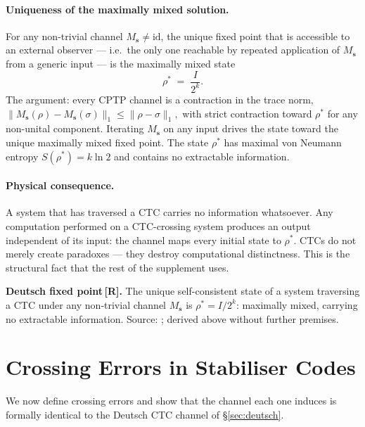 \documentclass[11pt,a4paper]{article}
\newcommand{\Rmark}{\textcolor{green!50!black}{\textbf{[R]}}}
\newcommand{\Ms}{M_{\mathbf{s}}}
\begin{document}
\paragraph{Uniqueness of the maximally mixed solution.}
For any non-trivial channel $\Ms\neq\mathrm{id}$, the unique fixed point that is accessible to an external observer --- i.e.\ the only one reachable by repeated application of $\Ms$ from a generic input --- is the maximally mixed state
\begin{equation}
  \rho^* \;=\; \frac{I}{2^k}.
  \label{eq:maxmixed}
\end{equation}
The argument: every CPTP channel is a contraction in the trace norm,
\(
  \|\Ms(\rho)-\Ms(\sigma)\|_1 \leq \|\rho-\sigma\|_1,
\)
with strict contraction toward $\rho^*$ for any non-unital component. Iterating $\Ms$ on any input drives the state toward the unique maximally mixed fixed point. The state $\rho^*$ has maximal von Neumann entropy $S(\rho^*)=k\ln 2$ and contains no extractable information.

\paragraph{Physical consequence.}
A system that has traversed a CTC carries no information whatsoever. Any computation performed on a CTC-crossing system produces an output independent of its input: the channel maps every initial state to $\rho^*$. CTCs do not merely create paradoxes --- they destroy computational distinctness. This is the structural fact that the rest of the supplement uses.

\begin{mdframed}[backgroundcolor=ctcbg,linecolor=ctccol,linewidth=1.5pt]
\textbf{Deutsch fixed point\,\Rmark.}\quad
The unique self-consistent state of a system traversing a CTC under any non-trivial channel $\Ms$ is $\rho^* = I/2^k$: maximally mixed, carrying no extractable information. Source: \cite{Deutsch1991}; derived above without further premises.
\end{mdframed}

\section{Crossing Errors in Stabiliser Codes}
\label{sec:crossing}

We now define crossing errors and show that the channel each one induces is formally identical to the Deutsch CTC channel of \S\ref{sec:deutsch}.
\end{document}
